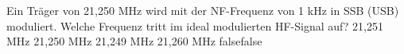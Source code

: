     {Ein Träger von 21,250 MHz wird mit der NF-Frequenz von 1 kHz in SSB (USB) moduliert. Welche Frequenz tritt im ideal modulierten HF-Signal auf?}
    {21,251 MHz}
    {21,250 MHz}
    {21,249 MHz}
    {21,260 MHz}
    {false}{false}
